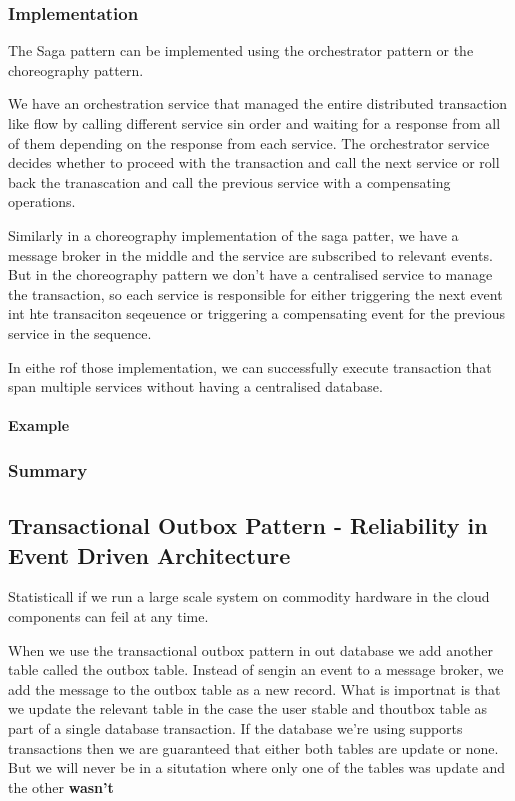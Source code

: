 \documentclass[a4paper, 11pt]{book}
\begin{document}
{    \subsubsection{Implementation}
    The Saga pattern can be implemented using the orchestrator pattern or the choreography pattern.

    We have an orchestration service that managed the entire distributed transaction like flow by calling different service sin order and waiting for a response from all of them depending on the response from each service.
    The orchestrator service decides whether to proceed with the transaction and call the next service or roll back the tranascation and call the previous service with a compensating operations.

    Similarly in a choreography implementation of the saga patter, we have a message broker in the middle and the service are subscribed to relevant events.
    But in the choreography pattern we don't have a centralised service to manage the transaction, so each service is responsible for either triggering the next event int hte transaciton seqeuence or triggering a compensating event for the previous service in the sequence.

    In eithe rof those implementation, we can successfully execute transaction that span multiple services without having a centralised database.

    \paragraph{Example}

    \subsubsection{Summary}

    \subsection{Transactional Outbox Pattern - Reliability in Event Driven Architecture}
    Statisticall if we run a large scale system on commodity hardware in the cloud components can feil at any time.

    When we use the transactional outbox pattern in out database we add another table called the outbox table.
    Instead of sengin an event to a message broker, we add the message to the outbox table as a new record.
    What is importnat is that we update the relevant table in the case the user stable and thoutbox table as part of a single database transaction.
    If the database we're using supports transactions then we are guaranteed that either both tables are update or none.
    But we will never be in a situtation where only one of the tables was update and the other \textbf{wasn't}

}
\end{document}

